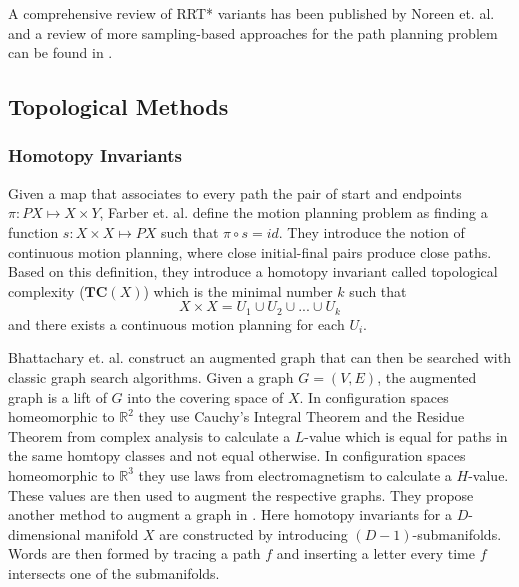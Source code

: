 \documentclass[11pt,twocolumn]{article}
\begin{document}
A comprehensive review of RRT* variants has been published by Noreen
et. al.  \cite{noreenOptimalPathPlanning2016a} and a review of more
sampling-based approaches for the path planning problem can be found
in \cite{elbanhawiSamplingBasedRobotMotion2014}.

\subsection*{Topological Methods}
\subsubsection*{Homotopy Invariants}
Given a map that associates to every path the pair of start and
endpoints \(\pi: PX \mapsto X \times Y\), Farber
et. al. \cite{farberTopologicalComplexityMotion2003} define the motion
planning problem as finding a function \(s: X \times X \mapsto PX\)
such that \(\pi \circ s = id\). They introduce
the notion of continuous motion planning, where close initial-final
pairs produce close paths. Based on this definition, they introduce a
homotopy invariant called topological complexity (\(\textbf{TC}(X)\))
which is the minimal number \(k\) such that
\[X \times X = U_{1} \cup U_{2} \cup ... \cup U_{k}\]
and there exists a continuous motion planning for each \(U_{i}\).

Bhattachary
et. al. \cite{bhattacharyaSearchbasedPathPlanning2010,bhattacharyaSearchBasedPathPlanning2012}
construct an augmented graph that can then be searched with classic
graph search algorithms. Given a graph \(G = (V, E)\), the augmented
graph is a lift of \(G\) into the covering space of \(X\). In
configuration spaces homeomorphic to \(\mathbb{R}^{2}\) they use
Cauchy's Integral Theorem and the Residue Theorem from complex
analysis to calculate a \(L\)-value which is equal for paths in the
same homtopy classes and not equal otherwise. In configuration spaces
homeomorphic to \(\mathbb{R}^{3}\) they use laws from electromagnetism
to calculate a \(H\)-value. These values are then used to augment the
respective graphs.  They propose another method to augment a graph in
\cite{bhattacharyaPathHomotopyInvariants2018}.  Here homotopy
invariants for a \(D\)-dimensional manifold \(X\) are constructed by
introducing \((D - 1)\)-submanifolds. Words are then formed by tracing
a path \(f\) and inserting a letter every time \(f\) intersects one of
the submanifolds.
\end{document}

